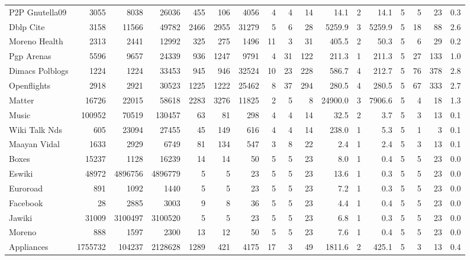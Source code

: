 \documentclass{article}
\begin{document}
\begin{landscape}
\begin{table}[htbp]
\begin{tabular}{l *{16}{r}}
        \midrule
        P2P Gnutella09 & 3055 & 8038 & 26036 & 455 & 106 & 4056 & 4 & 4 & 14 & 14.1 & 2 & 14.1 & 5 & 5 & 23 & 0.3 \\
        Dblp Cite & 3158 & 11566 & 49782 & 2466 & 2955 & 31279 & 5 & 6 & 28 & 5259.9 & 3 & 5259.9 & 5 & 18 & 88 & 2.6 \\
        Moreno Health & 2313 & 2441 & 12992 & 325 & 275 & 1496 & 11 & 3 & 31 & 405.5 & 2 & 50.3 & 5 & 6 & 29 & 0.2 \\
        Pgp Arenas & 5596 & 9657 & 24339 & 936 & 1247 & 9791 & 4 & 31 & 122 & 211.3 & 1 & 211.3 & 5 & 27 & 133 & 1.0 \\
        Dimacs Polblogs & 1224 & 1224 & 33453 & 945 & 946 & 32524 & 10 & 23 & 228 & 586.7 & 4 & 212.7 & 5 & 76 & 378 & 2.8 \\
        Openflights & 2918 & 2921 & 30523 & 1225 & 1222 & 25462 & 8 & 37 & 294 & 280.5 & 4 & 280.5 & 5 & 67 & 333 & 2.7 \\
        \midrule
        Matter & 16726 & 22015 & 58618 & 2283 & 3276 & 11825 & 2 & 5 & 8 & 24900.0 & 3 & 7906.6 & 5 & 4 & 18 & 1.3 \\
        Music & 100952 & 70519 & 130457 & 63 & 81 & 298 & 4 & 4 & 14 & 32.5 & 2 & 3.7 & 5 & 3 & 13 & 0.1 \\
        Wiki Talk Nds & 605 & 23094 & 27455 & 45 & 149 & 616 & 4 & 4 & 14 & 238.0 & 1 & 5.3 & 5 & 1 & 3 & 0.1 \\
        Maayan Vidal & 1633 & 2929 & 6749 & 81 & 134 & 547 & 3 & 8 & 22 & 2.4 & 1 & 2.4 & 5 & 3 & 13 & 0.1 \\
        Boxes & 15237 & 1128 & 16239 & 14 & 14 & 50 & 5 & 5 & 23 & 8.0 & 1 & 0.4 & 5 & 5 & 23 & 0.0 \\
        Eswiki & 48972 & 4896756 & 4896779 & 5 & 5 & 23 & 5 & 5 & 23 & 13.6 & 1 & 0.3 & 5 & 5 & 23 & 0.0 \\
        Euroroad & 891 & 1092 & 1440 & 5 & 5 & 23 & 5 & 5 & 23 & 7.2 & 1 & 0.3 & 5 & 5 & 23 & 0.0 \\
        Facebook & 28 & 2885 & 3003 & 9 & 8 & 36 & 5 & 5 & 23 & 4.4 & 1 & 0.4 & 5 & 5 & 23 & 0.0 \\
        Jawiki & 31009 & 3100497 & 3100520 & 5 & 5 & 23 & 5 & 5 & 23 & 6.8 & 1 & 0.3 & 5 & 5 & 23 & 0.0 \\
        Moreno & 888 & 1597 & 2300 & 13 & 12 & 50 & 5 & 5 & 23 & 7.6 & 1 & 0.4 & 5 & 5 & 23 & 0.0 \\
        Appliances & 1755732 & 104237 & 2128628 & 1289 & 421 & 4175 & 17 & 3 & 49 & 1811.6 & 2 & 425.1 & 5 & 3 & 13 & 0.4 \\

\end{tabular}
\end{table}
\end{landscape}
\end{document}
